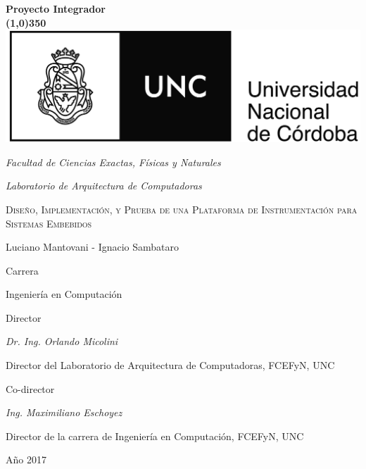 \documentclass[a4paper]{report}
\date{}
\begin{document}
\begin{titlepage}
\centering
\textbf{\huge{Proyecto Integrador} \\ \line(1,0){350}} \\
\vspace{0.5cm}\includegraphics[scale=0.53]{Escudo.jpg}\\
\vspace{0.15cm}
{\large\itshape Facultad de Ciencias Exactas, Físicas y Naturales\par}
\vspace{0.15cm}
{\large\itshape Laboratorio de Arquitectura de Computadoras\par}
\vspace{1cm}
{\scshape\Huge Diseño, Implementación, y Prueba de una Plataforma de Instrumentación para Sistemas Embebidos\par}
\vspace{1cm}
{\Large Luciano Mantovani - Ignacio Sambataro\par}
\vspace{1.5cm}
{\large Carrera\par}
\vspace{0.10cm}
{\large Ingeniería en Computación\par}
\vspace{1cm}
{\large Director\par}
\vspace{0.10cm}
{\large\itshape Dr. Ing. Orlando Micolini\par}
{Director del Laboratorio de Arquitectura de Computadoras, FCEFyN, UNC\par}
\vspace{1cm}
{\large Co-director\par}
\vspace{0.10cm}
{\large\itshape Ing. Maximiliano Eschoyez\par}
{Director de la carrera de Ingeniería en Computación, FCEFyN, UNC\par}

\vfill

{\large Año 2017 \par}
\end{titlepage}
\end{document}
